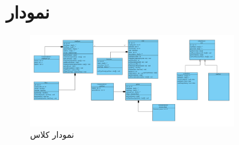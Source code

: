 \documentclass[a4paper,12pt]{report}
\begin{document}
	\section{
		نمودار 
		}\label{sec3:chap2}

	\begin{figure}[!h]
		\label{fig1:sec3:chap2}
		\begin{center}
			\includegraphics[width=0.8\textwidth]{diagrams/classDiagram.pdf}
			\caption{نمودار کلاس}
		\end{center}
	\end{figure}
\end{document}
